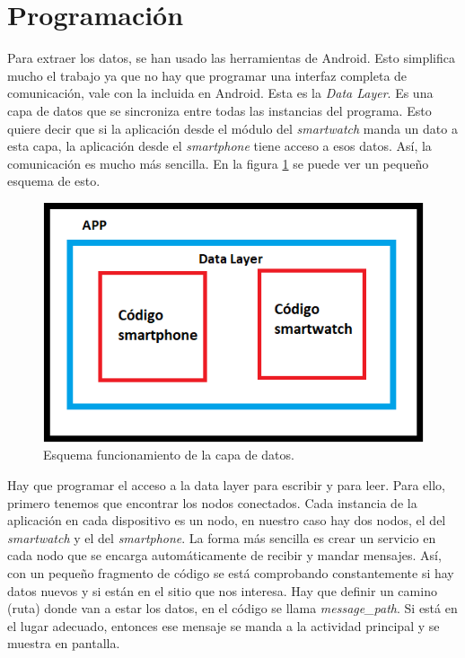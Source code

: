 \documentclass[12pt]{book}
\numberwithin{equation}{section}
\begin{document}
\section{Programación}

Para extraer los datos, se han usado las herramientas de Android. Esto simplifica mucho el trabajo ya que no hay que programar una interfaz completa de comunicación, vale con la incluida en Android. Esta es la \textit{Data Layer}. Es una capa de datos que se sincroniza entre todas las instancias del programa. Esto quiere decir que si la aplicación desde el módulo del \textit{smartwatch} manda un dato a esta capa, la aplicación desde el \textit{smartphone} tiene acceso a esos datos. Así, la comunicación es mucho más sencilla. En la figura \ref{fig:datalayer} se puede ver un pequeño esquema de esto.

\begin{figure}[h]
    \centering
    \includegraphics[width=1\textwidth]{esquemacodigo.png}
    \caption{Esquema funcionamiento de la capa de datos.}
    \label{fig:datalayer}
\end{figure}


Hay que programar el acceso a la data layer para escribir y para leer. Para ello, primero tenemos que encontrar los nodos conectados. Cada instancia de la aplicación en cada dispositivo es un nodo, en nuestro caso hay dos nodos, el del \textit{smartwatch} y el del \textit{smartphone}. La forma más sencilla es crear un servicio en cada nodo que se encarga automáticamente de recibir y mandar mensajes. Así, con un pequeño fragmento de código se está comprobando constantemente si hay datos nuevos y si están en el sitio que nos interesa. Hay que definir un camino (ruta) donde van a estar los datos, en el código se llama \textit{message\_path}. Si está en el lugar adecuado, entonces ese mensaje se manda a la actividad principal y se muestra en pantalla.
\end{document}
